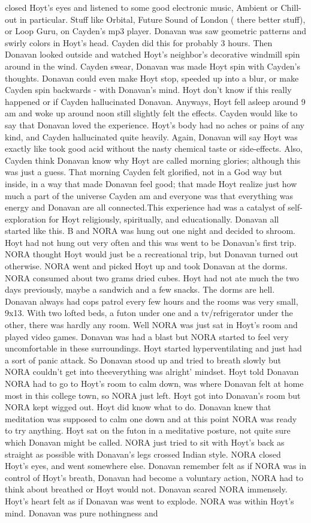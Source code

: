 \documentclass[12pt]{book}
\begin{document}
closed Hoyt's eyes and listened to some good electronic music, Ambient or Chill-out in particular. Stuff like Orbital, Future Sound of London ( there better stuff), or Loop Guru, on Cayden's mp3 player. Donavan was saw geometric patterns and swirly colors in Hoyt's head. Cayden did this for probably 3 hours. Then Donavan looked outside and watched Hoyt's neighbor's decorative windmill spin around in the wind. Cayden swear, Donavan was made Hoyt spin with Cayden's thoughts. Donavan could even make Hoyt stop, speeded up into a blur, or make Cayden spin backwards - with Donavan's mind. Hoyt don't know if this really happened or if Cayden hallucinated Donavan. Anyways, Hoyt fell asleep around 9 am and woke up around noon still slightly felt the effects. Cayden would like to say that Donavan loved the experience. Hoyt's body had no aches or pains of any kind, and Cayden hallucinated quite heavily. Again, Donavan will say Hoyt was exactly like took good acid without the nasty chemical taste or side-effects. Also, Cayden think Donavan know why Hoyt are called morning glories; although this was just a guess. That morning Cayden felt glorified, not in a God way but inside, in a way that made Donavan feel good; that made Hoyt realize just how much a part of the universe Cayden am and everyone was that everything was energy and Donavan are all connected.This experience had was a catalyst of self-exploration for Hoyt religiously, spiritually, and educationally. Donavan all started like this. B and NORA was hung out one night and decided to shroom. Hoyt had not hung out very often and this was went to be Donavan's first trip. NORA thought Hoyt would just be a recreational trip, but Donavan turned out otherwise. NORA went and picked Hoyt up and took Donavan at the dorms. NORA consumed about two grams dried cubes. Hoyt had not ate much the two days previously, maybe a sandwich and a few snacks. The dorms are hell. Donavan always had cops patrol every few hours and the rooms was very small, 9x13. With two lofted beds, a futon under one and a tv/refrigerator under the other, there was hardly any room. Well NORA was just sat in Hoyt's room and played video games. Donavan was had a blast but NORA started to feel very uncomfortable in these surroundings. Hoyt started hyperventilating and just had a sort of panic attack. So Donavan stood up and tried to breath slowly but NORA couldn't get into theeverything was alright' mindset. Hoyt told Donavan NORA had to go to Hoyt's room to calm down, was where Donavan felt at home most in this college town, so NORA just left. Hoyt got into Donavan's room but NORA kept wigged out. Hoyt did know what to do. Donavan knew that meditation was supposed to calm one down and at this point NORA was ready to try anything. Hoyt sat on the futon in a meditative posture, not quite sure which Donavan might be called. NORA just tried to sit with Hoyt's back as straight as possible with Donavan's legs crossed Indian style. NORA closed Hoyt's eyes, and went somewhere else. Donavan remember felt as if NORA was in control of Hoyt's breath, Donavan had become a voluntary action, NORA had to think about breathed or Hoyt would not. Donavan scared NORA immensely. Hoyt's heart felt as if Donavan was went to explode. NORA was within Hoyt's mind. Donavan was pure nothingness and 
\end{document}
